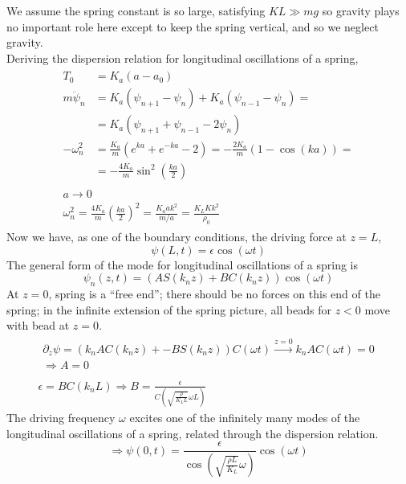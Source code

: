 \documentclass[twoside,10pt]{amsart}
\newcommand{\problemhead}[1]
  {\smallskip
   \noindent{\large\bf Problem #1.}
   \smallskip}
\begin{document}
\problemhead{7.3} We assume the spring constant is so large, satisfying $KL \gg mg$ so gravity plays no important role here except to keep the spring vertical, and so we neglect gravity.  \medskip \\
Deriving the dispersion relation for longitudinal oscillations of a spring,
\[
\begin{gathered}
\begin{aligned}
  T_0 & = K_a(a-a_0) \\
  m \ddot{ \psi}_n & = K_a (\psi_{n+1} - \psi_n) + K_a (\psi_{n-1} - \psi_n) = \\
  & = K_a (\psi_{n+1} + \psi_{n-1} - 2 \psi_n ) \\
  -\omega_n^2 & = \frac{K_a}{m} (e^{ka} + e^{-ka} - 2) = -\frac{2K_a}{m} (1- \cos{(ka)}) = \\
  & = -\frac{4K_a}{m} \sin^2{\left( \frac{ka}{2} \right) } 
\end{aligned} \\
\begin{gathered}
  a\to 0 \\
  \omega_n^2 = \frac{4K_a}{m} \left( \frac{ka}{2} \right)^2 = \frac{K_a a k^2}{m/a} = \frac{K_L K k^2 }{\rho_0}
\end{gathered}
\end{gathered}
\]
Now we have, as one of the boundary conditions, the driving force at $z=L$,
\[
\psi(L,t) = \epsilon \cos{(\omega t) }
\]
The general form of the mode for longitudinal oscillations of a spring is
\[
\psi_n(z,t) = (A S(k_n z) + BC(k_n z) ) \cos{(\omega t) }
\]
At $z=0$, spring is a ``free end''; there should be no forces on this end of the spring; in the infinite extension of the spring picture, all beads for $z<0$ move with bead at $z=0$.  
\[
\begin{gathered}
\begin{gathered}
  \partial_z \psi = (k_n A C(k_n z) + - BS(k_n z) ) C(\omega t) \xrightarrow{z=0} k_n A C(\omega t) = 0 \\
 \Longrightarrow  A = 0 
\end{gathered}  \\
\quad \\
\epsilon = B C(k_n L) \Longrightarrow B = \frac{ \epsilon}{ C(\sqrt{ \frac{ \rho}{K_L L } } \omega L ) }
\end{gathered}
\]
The driving frequency $\omega$ excites one of the infinitely many modes of the longitudinal oscillations of a spring, related through the dispersion relation.  
\[
\Longrightarrow \boxed{ \psi(0,t) = \frac{ \epsilon}{ \cos{ \left( \sqrt{ \frac{ \rho L}{ K_L }} \omega \right) } } \cos{ (\omega t) } }
\]
\end{document}
